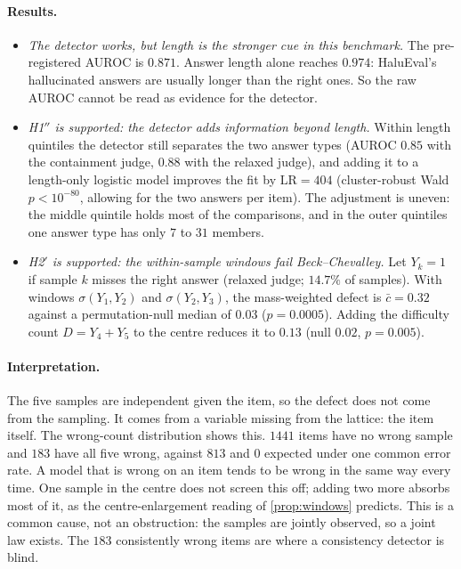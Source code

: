 \documentclass[11pt]{article}
\theoremstyle{definition}
\begin{document}
\paragraph{Results.}
\begin{itemize}
\item \emph{The detector works, but length is the stronger cue in this benchmark.} The pre-registered AUROC is $0.871$. Answer length
  alone reaches $0.974$: HaluEval's hallucinated answers are usually longer than the right ones. So the raw AUROC cannot be read as
  evidence for the detector.
\item \emph{H1$''$ is supported: the detector adds information beyond length.} Within length quintiles the detector still separates the
  two answer types (AUROC $0.85$ with the containment judge, $0.88$ with the relaxed judge), and adding it to a length-only logistic
  model improves the fit by $\mathrm{LR}=404$ (cluster-robust Wald $p<10^{-80}$, allowing for the two answers per item). The
  adjustment is uneven: the middle quintile holds most of the comparisons, and in the outer quintiles one answer type has only $7$ to
  $31$ members.
\item \emph{H2$'$ is supported: the within-sample windows fail Beck--Chevalley.} Let $Y_k=1$ if sample $k$ misses the right answer
  (relaxed judge; $14.7\%$ of samples). With windows $\sigma(Y_1,Y_2)$ and $\sigma(Y_2,Y_3)$, the mass-weighted defect is
  $\bar c=0.32$ against a permutation-null median of $0.03$ ($p=0.0005$). Adding the difficulty count $D=Y_4+Y_5$ to the centre reduces
  it to $0.13$ (null $0.02$, $p=0.005$).
\end{itemize}

\paragraph{Interpretation.} The five samples are independent given the item, so the defect does not come from the sampling. It comes from
a variable missing from the lattice: the item itself. The wrong-count distribution shows this. $1441$ items have no wrong sample and
$183$ have all five wrong, against $813$ and $0$ expected under one common error rate. A model that is wrong on an item tends to be
wrong in the same way every time. One sample in the centre does not screen this off; adding two more absorbs most of it, as the
centre-enlargement reading of \cref{prop:windows} predicts. This is a common cause, not an obstruction: the samples are jointly
observed, so a joint law exists. The $183$ consistently wrong items are where a consistency detector is blind.
\end{document}
